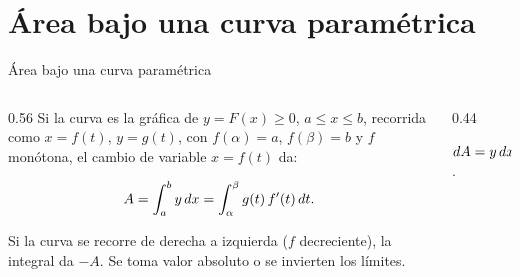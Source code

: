 \documentclass[10pt,aspectratio=169]{beamer}
\begin{document}
\section{Área bajo una curva paramétrica}

\begin{frame}{Área bajo una curva paramétrica}
  \begin{columns}
    \begin{column}{0.56\textwidth}
      Si la curva es la gráfica de $y=F(x)\ge0$, $a\le x\le b$, recorrida como $x=f(t)$, $y=g(t)$, con
      $f(\alpha)=a$, $f(\beta)=b$ y $f$ monótona, el cambio de variable $x=f(t)$ da:
      \begin{teorema}
        \[ A=\int_a^by\,dx=\int_\alpha^\beta g(t)\,f'(t)\,dt. \]
      \end{teorema}
      \begin{observacion}
        Si la curva se recorre de derecha a izquierda ($f$ decreciente), la integral da $-A$.
        Se toma valor absoluto o se invierten los límites.
      \end{observacion}
    \end{column}
    \begin{column}{0.44\textwidth}
      \centering

      \small $dA=y\,dx=g(t)\,f'(t)\,dt$.
    \end{column}
  \end{columns}
\end{frame}
\end{document}
